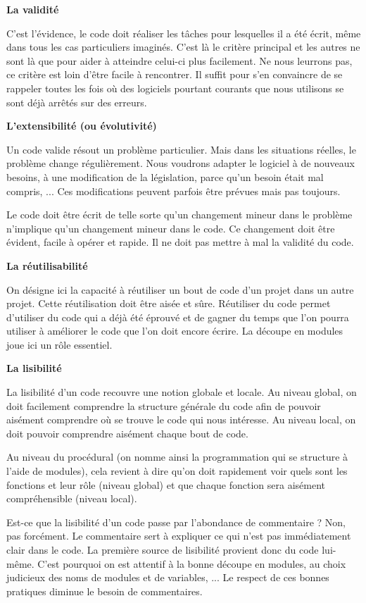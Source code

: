 {\sffamily\bfseries\upshape
La validité}

{
C'est l'évidence, le code doit
réaliser les tâches pour lesquelles il a été écrit, même dans tous les
cas particuliers imaginés. C'est là le critère
principal et les autres ne sont là que pour aider à atteindre celui-ci
plus facilement. Ne nous leurrons pas, ce critère est loin
d'être facile à rencontrer. Il suffit pour
s'en convaincre de se rappeler toutes les fois où des
logiciels pourtant courants que nous utilisons se sont déjà arrêtés sur
des erreurs.}

{\sffamily\bfseries\upshape
L'extensibilité (ou évolutivité)}

{
Un code valide résout un problème particulier. Mais dans les situations
réelles, le problème change régulièrement. Nous voudrons adapter le
logiciel à de nouveaux besoins, à une modification de la législation,
parce qu’un besoin était mal compris, ... Ces modifications peuvent
parfois être prévues mais pas toujours.}

{
Le code doit être écrit de telle sorte qu'un changement
mineur dans le problème n'implique
qu'un changement mineur dans le code. Ce changement
doit être évident, facile à opérer et rapide. Il ne doit pas mettre à
mal la validité du code.}

{\sffamily\bfseries\upshape
La réutilisabilité}

{
On désigne ici la capacité à réutiliser un bout de code
d'un projet dans un autre projet. Cette réutilisation
doit être aisée et sûre. Réutiliser du code permet
d'utiliser du code qui a déjà été éprouvé et de gagner
du temps que l'on pourra utiliser à améliorer le code
que l'on doit encore écrire. La découpe en modules
joue ici un rôle essentiel.}

{\sffamily\bfseries\upshape
La lisibilité}

{
La lisibilité d'un code recouvre une notion globale et
locale. Au niveau global, on doit facilement comprendre la structure
générale du code afin de pouvoir aisément comprendre où se trouve le
code qui nous intéresse. Au niveau local, on doit pouvoir comprendre
aisément chaque bout de code.}

{
Au niveau du procédural (on nomme ainsi la programmation qui se
structure à l'aide de modules), cela revient à dire
qu'on doit rapidement voir quels sont les fonctions et
leur rôle (niveau global) et que chaque fonction sera aisément
compréhensible (niveau local). }

{
Est-ce que la lisibilité d'un code passe par
l'abondance de commentaire ? Non, pas forcément. Le
commentaire sert à expliquer ce qui n'est pas
immédiatement clair dans le code. La première source de lisibilité
provient donc du code lui-même. C'est pourquoi on est
attentif à la bonne découpe en modules, au choix judicieux des noms de
modules et de variables, ... Le respect de ces bonnes pratiques diminue
le besoin de commentaires.}

